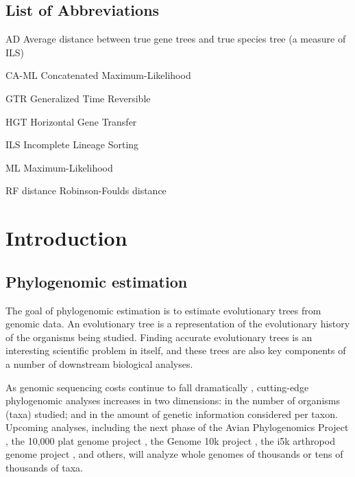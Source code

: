 \documentclass[edeposit,fullpage]{uiucthesis2014}
\theoremstyle{definition}
\begin{document}
\chapter{List of Abbreviations}

\begin{symbollist*}
\item[AD] Average distance between true gene trees and true species tree (a measure of ILS)
\item[CA-ML] Concatenated Maximum-Likelihood
\item[GTR] Generalized Time Reversible
\item[HGT] Horizontal Gene Transfer
\item[ILS] Incomplete Lineage Sorting
\item[ML] Maximum-Likelihood
\item[RF distance] Robinson-Foulds distance
\end{symbollist*}



\mainmatter
\part{Introduction}

\chapter{Phylogenomic estimation}


The goal of phylogenomic estimation is to estimate evolutionary trees
from genomic data. An evolutionary tree is a representation of the
evolutionary history of the organisms being studied. Finding accurate
evolutionary trees is an interesting scientific problem in itself, and
these trees are also key components of a number of downstream
biological analyses.

As genomic sequencing costs continue to fall dramatically \cite{},
cutting-edge phylogenomic analyses increases in two dimensions: in the
number of organisms (taxa) studied; and in the amount of genetic
information considered per taxon. Upcoming analyses, including the
next phase of the Avian Phylogenomics Project \cite{}, the 10,000 plat
genome project \cite{}, the Genome 10k project \cite{}, the i5k
arthropod genome project \cite{}, and others, will analyze whole
genomes of thousands or tens of thousands of taxa.
\end{document}
